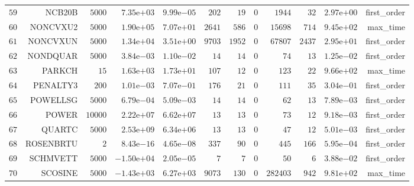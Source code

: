 \begin{longtable}{rrrrrrrrrrrr}
  \(    59\) & NCB20B & \(  5000\) & \( 7.35\)e\(+03\) & \( 9.99\)e\(-05\) & \(   202\) & \(    19\) & \(     0\) & \(  1944\) & \(    32\) & \( 2.97\)e\(+00\) & first\_order \\
  \(    60\) & NONCVXU2 & \(  5000\) & \( 1.90\)e\(+05\) & \( 7.07\)e\(+01\) & \(  2641\) & \(   586\) & \(     0\) & \( 15698\) & \(   714\) & \( 9.45\)e\(+02\) & max\_time \\
  \(    61\) & NONCVXUN & \(  5000\) & \( 1.34\)e\(+04\) & \( 3.51\)e\(+00\) & \(  9703\) & \(  1952\) & \(     0\) & \( 67807\) & \(  2437\) & \( 2.95\)e\(+01\) & first\_order \\
  \(    62\) & NONDQUAR & \(  5000\) & \( 3.84\)e\(-03\) & \( 1.10\)e\(-02\) & \(    14\) & \(    14\) & \(     0\) & \(    74\) & \(    13\) & \( 1.25\)e\(-02\) & first\_order \\
  \(    63\) & PARKCH & \(    15\) & \( 1.63\)e\(+03\) & \( 1.73\)e\(+01\) & \(   107\) & \(    12\) & \(     0\) & \(   123\) & \(    22\) & \( 9.66\)e\(+02\) & max\_time \\
  \(    64\) & PENALTY3 & \(   200\) & \( 1.01\)e\(-03\) & \( 7.07\)e\(-01\) & \(   176\) & \(    21\) & \(     0\) & \(   111\) & \(    35\) & \( 3.04\)e\(-01\) & first\_order \\
  \(    65\) & POWELLSG & \(  5000\) & \( 6.79\)e\(-04\) & \( 5.09\)e\(-03\) & \(    14\) & \(    14\) & \(     0\) & \(    62\) & \(    13\) & \( 7.89\)e\(-03\) & first\_order \\
  \(    66\) & POWER & \( 10000\) & \( 2.22\)e\(+07\) & \( 6.62\)e\(+07\) & \(    13\) & \(    13\) & \(     0\) & \(    73\) & \(    12\) & \( 9.18\)e\(-03\) & first\_order \\
  \(    67\) & QUARTC & \(  5000\) & \( 2.53\)e\(+09\) & \( 6.34\)e\(+06\) & \(    13\) & \(    13\) & \(     0\) & \(    47\) & \(    12\) & \( 5.01\)e\(-03\) & first\_order \\
  \(    68\) & ROSENBRTU & \(     2\) & \( 8.43\)e\(-16\) & \( 4.65\)e\(-08\) & \(   337\) & \(    90\) & \(     0\) & \(   445\) & \(   166\) & \( 5.95\)e\(-04\) & first\_order \\
  \(    69\) & SCHMVETT & \(  5000\) & \(-1.50\)e\(+04\) & \( 2.05\)e\(-05\) & \(     7\) & \(     7\) & \(     0\) & \(    50\) & \(     6\) & \( 3.88\)e\(-02\) & first\_order \\
  \(    70\) & SCOSINE & \(  5000\) & \(-1.43\)e\(+03\) & \( 6.27\)e\(+03\) & \(  9073\) & \(   130\) & \(     0\) & \(282403\) & \(   942\) & \( 9.81\)e\(+02\) & max\_time \\

\end{longtable}
